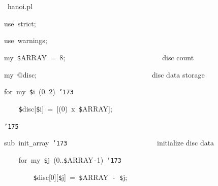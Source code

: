 \documentclass[a4paper,10pt]{article}
\def\mc{\relax}
\begin{document}
\noindent
\mbox{}\rm\mc {\tt\#} \hrulefill 
\tt\mc 

\noindent
\mbox{}\hfill

\noindent
\mbox{}\rm\mc {\tt\#} \hrulefill\ hanoi.pl \ \hrulefill
\tt\mc 

\noindent
\mbox{}\hfill

\noindent
\mbox{}use{\tt\mc \ }strict;

\noindent
\mbox{}use{\tt\mc \ }warnings;

\noindent
\mbox{}\hfill

\noindent
\mbox{}my{\tt\mc \ }{\tt\$}ARRAY{\tt\mc \ }={\tt\mc \ }8;{\tt\mc \ }{\tt\mc \ }{\tt\mc \ }{\tt\mc \ }{\tt\mc \ }{\tt\mc \ }{\tt\mc \ }{\tt\mc \ }{\tt\mc \ }{\tt\mc \ }{\tt\mc \ }{\tt\mc \ }{\tt\mc \ }{\tt\mc \ }{\tt\mc \ }{\tt\mc \ }{\tt\mc \ }{\tt\mc \ }{\tt\mc \ }{\tt\mc \ }{\tt\mc \ }{\tt\mc \ }{\tt\mc \ }{\tt\mc \ }{\tt\mc \ }{\tt\mc \ }\rm\mc {\tt\#} disc count
\tt\mc 

\noindent
\mbox{}my{\tt\mc \ }@disc;{\tt\mc \ }{\tt\mc \ }{\tt\mc \ }{\tt\mc \ }{\tt\mc \ }{\tt\mc \ }{\tt\mc \ }{\tt\mc \ }{\tt\mc \ }{\tt\mc \ }{\tt\mc \ }{\tt\mc \ }{\tt\mc \ }{\tt\mc \ }{\tt\mc \ }{\tt\mc \ }{\tt\mc \ }{\tt\mc \ }{\tt\mc \ }{\tt\mc \ }{\tt\mc \ }{\tt\mc \ }{\tt\mc \ }{\tt\mc \ }{\tt\mc \ }{\tt\mc \ }{\tt\mc \ }{\tt\mc \ }{\tt\mc \ }{\tt\mc \ }{\tt\mc \ }\rm\mc {\tt\#} disc data storage
\tt\mc 

\noindent
\mbox{}for{\tt\mc \ }my{\tt\mc \ }{\tt\$}i{\tt\mc \ }(0..2){\tt\mc \ }{\tt\char'173}

\noindent
\mbox{}{\tt\mc \ }{\tt\mc \ }{\tt\mc \ }{\tt\mc \ }{\tt\$}disc[{\tt\$}i]{\tt\mc \ }={\tt\mc \ }[(0){\tt\mc \ }x{\tt\mc \ }{\tt\$}ARRAY];

\noindent
\mbox{}{\tt\char'175}

\noindent
\mbox{}\hfill

\noindent
\mbox{}sub{\tt\mc \ }init{\tt\_}array{\tt\mc \ }{\tt\char'173}{\tt\mc \ }{\tt\mc \ }{\tt\mc \ }{\tt\mc \ }{\tt\mc \ }{\tt\mc \ }{\tt\mc \ }{\tt\mc \ }{\tt\mc \ }{\tt\mc \ }{\tt\mc \ }{\tt\mc \ }{\tt\mc \ }{\tt\mc \ }{\tt\mc \ }{\tt\mc \ }{\tt\mc \ }{\tt\mc \ }{\tt\mc \ }{\tt\mc \ }{\tt\mc \ }{\tt\mc \ }{\tt\mc \ }{\tt\mc \ }\rm\mc {\tt\#} initialize disc data
\tt\mc 

\noindent
\mbox{}{\tt\mc \ }{\tt\mc \ }{\tt\mc \ }{\tt\mc \ }for{\tt\mc \ }my{\tt\mc \ }{\tt\$}j{\tt\mc \ }(0..{\tt\$}ARRAY{\tt -}1){\tt\mc \ }{\tt\char'173}

\noindent
\mbox{}{\tt\mc \ }{\tt\mc \ }{\tt\mc \ }{\tt\mc \ }{\tt\mc \ }{\tt\mc \ }{\tt\mc \ }{\tt\mc \ }{\tt\$}disc[0][{\tt\$}j]{\tt\mc \ }={\tt\mc \ }{\tt\$}ARRAY{\tt\mc \ }{\tt -}{\tt\mc \ }{\tt\$}j;
\end{document}
